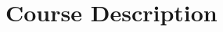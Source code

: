 \documentclass[11pt,article]{memoir}
\begin{document}
\maketitle

\section*{Course Description}
\end{document}
